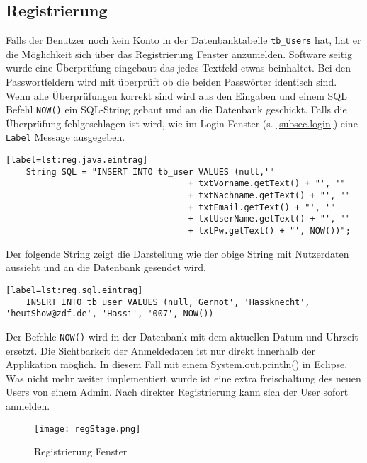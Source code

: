 \subsection{Registrierung}
\label{subsec.registrierung}
Falls der Benutzer noch kein Konto in der Datenbanktabelle \texttt{tb\_Users} hat, hat er die Möglichkeit sich über das Registrierung Fenster anzumelden. Software seitig wurde eine Überprüfung eingebaut das jedes Textfeld etwas beinhaltet. Bei den Passwortfeldern wird mit überprüft ob die beiden Passwörter identisch sind. Wenn alle Überprüfungen korrekt sind wird aus den Eingaben und einem SQL Befehl \texttt{NOW()} ein SQL-String gebaut und an die Datenbank geschickt. Falls die Überprüfung fehlgeschlagen ist wird, wie im  Login Fenster (s. \ref{subsec.login}) eine \texttt{Label} Message ausgegeben.
\begin{lstlisting}[caption={Java-SQL neuer Benutzer},captionpos=b][label=lst:reg.java.eintrag]
	String SQL = "INSERT INTO tb_user VALUES (null,'"
									+ txtVorname.getText() + "', '"
									+ txtNachname.getText() + "', '"
									+ txtEmail.getText() + "', '"
									+ txtUserName.getText() + "', '"
									+ txtPw.getText() + "', NOW())";
\end{lstlisting}
Der folgende String zeigt die Darstellung wie der obige String mit Nutzerdaten aussieht und an die Datenbank gesendet wird.
\begin{lstlisting}[caption={SQL Beispiel String},captionpos=b][label=lst:reg.sql.eintrag]
	INSERT INTO tb_user VALUES (null,'Gernot', 'Hassknecht', 'heutShow@zdf.de', 'Hassi', '007', NOW())
\end{lstlisting}

Der Befehle \texttt{NOW()} wird in der Datenbank mit dem aktuellen Datum und Uhrzeit ersetzt.
Die Sichtbarkeit der Anmeldedaten ist nur direkt innerhalb der Applikation möglich. In diesem Fall mit einem System.out.println() in Eclipse. Was nicht mehr weiter implementiert wurde ist eine extra freischaltung des neuen Users von einem Admin. Nach direkter Registrierung kann sich der User sofort anmelden.
\begin{figure}[h]
  \begin{center}
    \texttt{[image: regStage.png]}
  		  \caption{Registrierung Fenster}
     \label{fig.RegistrierungFenster}
  \end{center}
\end{figure}

